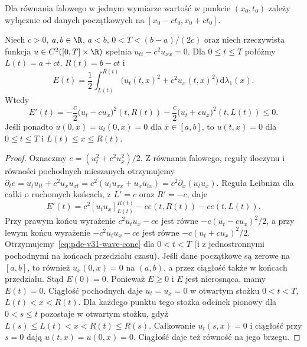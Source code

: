 \begin{center}
\par\smallskip\small
Dla równania falowego w jednym wymiarze wartość w punkcie
$(x_0,t_0)$ zależy wyłącznie od danych początkowych na
$[x_0-ct_0,x_0+ct_0]$.
\end{center}

\begin{stwierdzenie}
\label{prop:pde-v31-wave-cone}
Niech $c>0$, $a,b\in\R$, $a<b$, $0<T<(b-a)/(2c)$ oraz
niech rzeczywista funkcja $u\in C^2([0,T]\times\R)$ spełnia $u_{tt}-c^2u_{xx}=0$.
Dla $0\le t\le T$ połóżmy $L(t)=a+ct$, $R(t)=b-ct$ i
\[
 E(t)=\frac12\int_{L(t)}^{R(t)}
 \bigl(u_t(t,x)^2+c^2u_x(t,x)^2\bigr)\,\mathrm d\lambda_1(x).
\]
Wtedy
\begin{equation}\label{eq:pde-v31-wave-cone}
 E'(t)=-\frac c2\bigl(u_t-cu_x\bigr)^2(t,R(t))
       -\frac c2\bigl(u_t+cu_x\bigr)^2(t,L(t))\le0.
\end{equation}
Jeśli ponadto $u(0,x)=u_t(0,x)=0$ dla $x\in[a,b]$,
to $u(t,x)=0$ dla $0\le t\le T$ i $L(t)\le x\le R(t)$.
\end{stwierdzenie}
\begin{proof}
Oznaczmy $e=(u_t^2+c^2u_x^2)/2$. Z równania falowego,
reguły iloczynu i równości pochodnych mieszanych otrzymujemy
$\partial_t e=u_tu_{tt}+c^2u_xu_{xt}
=c^2(u_tu_{xx}+u_xu_{tx})=c^2\partial_x(u_tu_x)$.
Reguła Leibniza dla całki o ruchomych końcach, z
$L'=c$ oraz $R'=-c$, daje
\[
 E'(t)=c^2[u_tu_x]_{L(t)}^{R(t)}
       -ce(t,R(t))-ce(t,L(t)).
\]
Przy prawym końcu wyrażenie $c^2u_tu_x-ce$ jest równe
$-c(u_t-cu_x)^2/2$, a przy lewym końcu wyrażenie
$-c^2u_tu_x-ce$ jest równe $-c(u_t+cu_x)^2/2$.
Otrzymujemy~\eqref{eq:pde-v31-wave-cone} dla $0<t<T$
(i z jednostronnymi pochodnymi na końcach przedziału czasu).
Jeśli dane początkowe są zerowe na $[a,b]$, to również
$u_x(0,x)=0$ na $(a,b)$, a przez ciągłość także w końcach
przedziału. Stąd $E(0)=0$.
Ponieważ $E\ge0$ i $E$ jest nierosnąca, mamy $E(t)=0$.
Ciągłość pochodnych daje $u_t=u_x=0$ w otwartym stożku
$0<t<T$, $L(t)<x<R(t)$. Dla każdego punktu tego stożka
odcinek pionowy dla $0<s\leq t$ pozostaje w otwartym stożku,
gdyż $L(s)\leq L(t)<x<R(t)\leq R(s)$. Całkowanie
$u_t(s,x)=0$ i ciągłość przy $s=0$ dają $u(t,x)=u(0,x)=0$. Ciągłość daje też równość na jego brzegu.
\end{proof}


